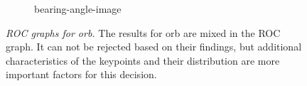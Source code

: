 \begin{figure}[H]
\begin{subfigure}[t]{0.45\linewidth}
    \caption{\gls{bearing-angle-image}}
\end{subfigure}
\caption[\acrshort{ROC} graphs for \acrshort{orb}]{\emph{\acrshort{ROC} graphs for \acrshort{orb}.} The results for \acrshort{orb} are mixed in the \acrshort{ROC} graph. It can not be rejected based on their findings, but additional characteristics of the keypoints and their distribution are more important factors for this decision.}\label{fig:orb_roc}
\end{figure}
